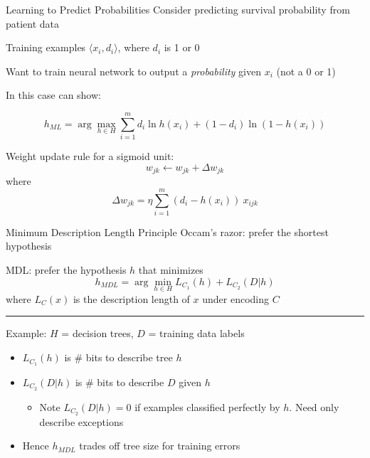 \documentclass[%
pdf,
colorBG,
slideColor,
tcrico,
]{prosper}
\begin{document}

\begin{slide}{ Learning to Predict Probabilities   }  
\tiny 
Consider predicting survival probability from patient data

Training examples $\langle x_{i}, d_{i} \rangle$, where $d_{i}$ is 1 or 0

Want to train neural network to output a {\em probability} given $x_i$ (not a 0 or 1)

In this case can show:

\[ h_{ML} = \arg\max_{h \in H} \sum_{i=1}^{m} d_{i} \ln h(x_{i}) + (1-d_{i})
\ln (1 - h(x_{i})) \]

Weight update rule for a sigmoid unit:
\[ w_{jk} \leftarrow w_{jk} +  \Delta w_{jk}\]
where
\[ \Delta w_{jk} = \eta \sum_{i=1}^{m} (d_{i} - h(x_{i})) \  x_{ijk} \]
\end{slide}


\begin{slide}{ Minimum Description Length Principle   }  
\tiny 
Occam's razor: prefer the shortest hypothesis

MDL: prefer the hypothesis $h$ that minimizes
\[h_{MDL} = \arg\min_{h \in H} L_{C_{1}}(h) + L_{C_{2}}(D|h) \]
where $L_{C}(x)$ is the description length of $x$ under encoding $C$

\rule{\textwidth}{.2mm}\vskip -3mm

\vspace*{.15in}
Example: $H$ =  decision trees, $D$ = training data labels
\begin{itemize}
\item $L_{C_{1}}(h)$ is \# bits to describe tree $h$
\item $L_{C_{2}}(D|h)$ is \# bits to describe $D$ given $h$
\begin{itemize}
\item Note $L_{C_{2}}(D|h)=0$ if examples classified perfectly by $h$. Need
only describe exceptions
\end{itemize}
\item Hence $h_{MDL}$ trades off tree size for training errors
\end{itemize}
\end{slide}

\end{document}
